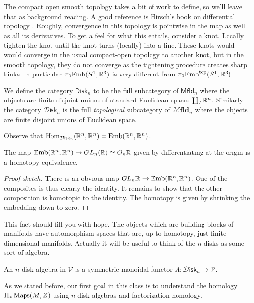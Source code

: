 \documentclass{amsart}
\DeclareMathOperator{\Emb}{Emb}
\begin{document}
The compact open smooth topology takes a bit of work to define, so we'll leave that
as background reading. A good reference is Hirsch's book on differential topology \cite{hirsch}.
Roughly, convergence in this topology is pointwise in the map as well as all its derivatives.
To get a feel for what this entails, consider a knot. Locally tighten the knot
until the knot turns (locally) into a line. These knots would would converge in the usual compact-open
topology to another knot, but in the smooth topology, they do not converge as the
tightening procedure creates sharp kinks.
In particular $\pi_0\text{Emb}(S^1,\mathbb{R}^3)$ is very different from
$\pi_0\text{Emb}^\text{top}(S^1,\mathbb{R}^3)$.

\begin{definition}
    We define the category $\mathsf{Disk}_n$ to be the full subcategory of
    $\mathsf{Mfld}_n$ where the objects are finite disjoint unions of standard
    Euclidean spaces $\coprod_I\mathbb{R}^n$. Similarly the category $\mathcal{D}\mathsf{isk}_n$
    is the full \textit{topological} subcategory of $\mathcal{M}\mathbf{fld}_n$ where the objects
    are finite disjoint unions of Euclidean space.
\end{definition}

Observe that $\operatorname{Hom}_{\mathcal{D}\mathsf{isk}_n}(\mathbb{R}^n,\mathbb{R}^n)=\text{Emb}(\mathbb{R}^n,\mathbb{R}^n)$.
\begin{lemma}
    The map $\Emb(\R^n,\R^n)\to GL_n(\R)\simeq O_n\R$ given by differentiating
    at the origin is a homotopy equivalence.
\end{lemma}
\begin{proof}[Proof sketch]
    There is an obvious map $GL_n\R \to \Emb(\R^n,\R^n)$. One of the composites is
    thus clearly the identity. It remains to show that the other composition is
    homotopic to the identity. The homotopy is given by shrinking the embedding
    down to zero.
\end{proof}

This fact should fill you with hope. The objects which are building blocks of manifolds
have automorphism spaces that are, up to homotopy, just finite-dimensional manifolds.
Actually it will be useful to think of the $n$-disks as some sort of algebra.

\begin{definition}
    An $n$-disk algebra in $\mathcal{V}$ is a symmetric monoidal functor
    $A:\mathcal{D}\mathsf{isk}_n\to\mathcal{V}$.
\end{definition}

As we stated before, our first goal in this class is to understand the homology 
$\operatorname{H}_*\operatorname{Maps}(M,Z)$ using $n$-disk algebras and factorization homology.
\end{document}
